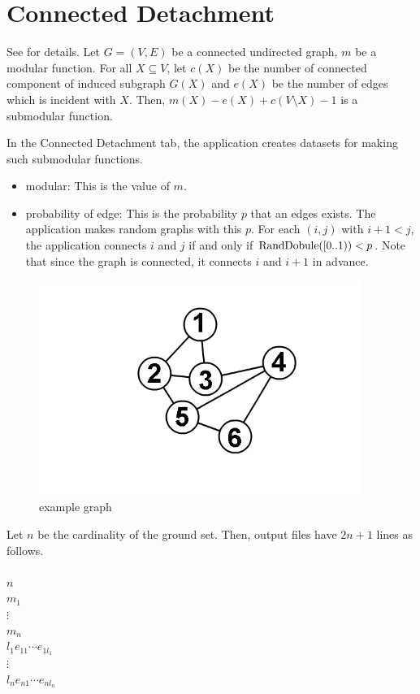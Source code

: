 \documentclass{article}
\newcommand{\modular}{modular: This is the value of $m$.
}
\newcommand{\exTab}[1]{
In the #1 tab,
the application creates datasets for making such submodular functions.}
\newcommand{\out}[1]{
Let $n$ be the cardinality of the ground set.
Then, output files have $#1$ lines as follows.\\ \mbox{}\\
}
\begin{document}
\newpage

\section{Connected Detachment}\label{connectedDetachmentSec}
See \cite{nash85} for details.
Let $G=(V,E)$ be a connected undirected graph,
$m$ be a modular function.
For all $X\subseteq V$,
let $c(X)$ be the number of connected component of induced subgraph $G(X)$
and $e(X)$ be the number of edges which is incident with $X$.
Then, $m(X)-e(X)+c(V\setminus X)-1$ is a submodular function.
\exTab{Connected Detachment}
\begin{itemize}
\item \modular
\item probability of edge: This is the probability $p$ that an edges exists.
The application makes random graphs with this $p$.
For each $(i,j)$ with $i+1<j$,
the application connects $i$ and $j$ if and only if ${\rm RandDobule}([0..1))<p$.
Note that since the graph is connected, it connects $i$ and $i+1$ in advance.
\end{itemize}

\begin{figure}[h!]\label{adjListPic}
{
\fontsize{10pt}{12pt}\selectfont
\centering
\includegraphics[height=7.0cm]{picture/graph.png}
\caption{example graph }
}
\end{figure}

\out{2n+1}
$n$\\
$m_1$ \\
$\vdots$ \\
$m_n$ \\
$l_1e_{11}\cdots e_{1l_1}$\\
\mbox{\quad \quad}$\vdots$ \\
$l_ne_{n1} \cdots e_{nl_n}$ \\
\end{document}
